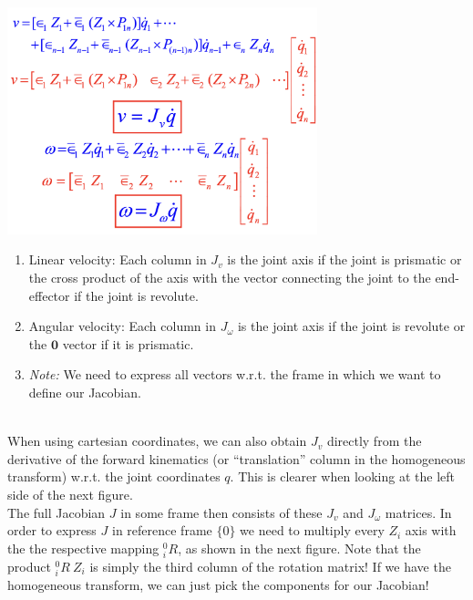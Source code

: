 \begin{minipage}[c]{0.5\textwidth}
	\includegraphics[width=9cm]{sections/imgs/4_jacobian_explicit_form_2.png}
\end{minipage}
\hfill
\begin{minipage}[c]{0.5\textwidth}
	\begin{center}
	\begin{enumerate}
		\item Linear velocity: Each column in $J_v$ is the joint axis if the joint is prismatic or the cross product of the axis with the vector connecting the joint to the end-effector if the joint is revolute.
		\item Angular velocity: Each column in $J_\omega$ is the  joint axis if the joint is revolute or the $\boldsymbol{0}$ vector if it is prismatic.
		\item \textit{Note:} We need to express all vectors w.r.t. the frame in which we want to define our Jacobian.
	\end{enumerate}
	\end{center}
\end{minipage}\\

When using cartesian coordinates, we can also obtain $J_v$ directly from the derivative of the forward kinematics (or ``translation'' column in the homogeneous transform) w.r.t. the joint coordinates $q$. This is clearer when looking at the left side of the next figure. \\

The full Jacobian $J$ in some frame then consists of these $J_v$ and $J_\omega$ matrices. In order to express $J$ in reference frame $\{0\}$ we need to multiply every $Z_i$ axis with the the respective mapping ${}^0_i R$, as shown in the next figure. Note that the product ${}^0_i R \ Z_i$ is simply the third column of the rotation matrix! If we have the homogeneous transform, we can just pick the components for our Jacobian!\\

